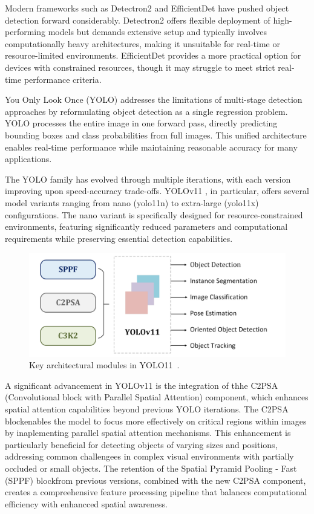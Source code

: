 \documentclass[../main.tex]{subfiles}
\begin{document}
Modern frameworks such as Detectron2 \cite{Merz_2023} and EfficientDet \cite{tan2020efficientdetscalableefficientobject} have pushed object detection forward considerably. Detectron2 offers flexible deployment of high-performing models but demands extensive setup and typically involves computationally heavy architectures, making it unsuitable for real-time or resource-limited environments. EfficientDet provides a more practical option for devices with constrained resources, though it may struggle to meet strict real-time performance criteria.

You Only Look Once (YOLO) addresses the limitations of multi-stage detection approaches by reformulating object detection as a single regression problem. YOLO processes the entire image in one forward pass, directly predicting bounding boxes and class probabilities from full images. This unified architecture enables real-time performance while maintaining reasonable accuracy for many applications.

The YOLO family has evolved through multiple iterations, with each version improving upon speed-accuracy trade-offs. YOLOv11 \cite{khanam2024yolov11overviewkeyarchitectural}, in particular, offers several model variants ranging from nano (yolo11n) to extra-large (yolo11x) configurations. The nano variant is specifically designed for resource-constrained environments, featuring significantly reduced parameters and computational requirements while preserving essential detection capabilities.

\begin{figure}[h!]
\centering
\includegraphics[width=\linewidth]{Figure/yolov11.png}
\caption{ Key architectural modules in YOLO11~\cite{khanam2024yolov11overviewkeyarchitectural}.}
\label{fig:yolov11}
\end{figure}

A significant advancement in YOLOv11 is the integration of thhe C2PSA (Convolutional
block with Parallel Spatial Attention) component, which enhances spatial attention capabilities beyond previous YOLO iterations. The C2PSA blockenables the model to focus more effectively on critical regions within images by inaplementing parallel spatial
attention mechanisms. This enhancement is particularly beneficial for detecting objects of varying sizes and positions, addressing common challengees in complex visual environments with partially occluded or small objects. The retention of the Spatial Pyramid Pooling - Fast (SPPF) blockfrom previous versions, combined with the new C2PSA component, creates a compreehensive feature processing pipeline that balances computational efficiency with enhancced spatial awareness.
\end{document}
